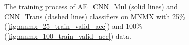 \begin{figure}[]
  \centering
  \hfill %
  \caption{The training process of AE\_CNN\_Mul (solid lines) and CNN\_Trans (dashed lines) classifiers on MNMX with 25\% (\ref{fig:mnmx_25_train_valid_acc}) and 100\% (\ref{fig:mnmx_100_train_valid_acc}) data.}
 \label{fig:mnmx_training_process}
\end{figure}